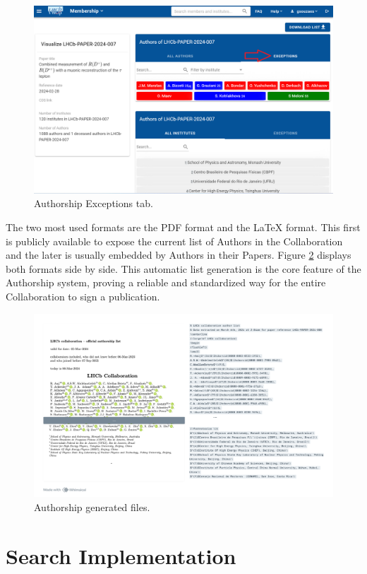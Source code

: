 \begin{figure}[H]
    \centering
    \includegraphics[width=0.8\linewidth]{figuras/authorship_exceptions_tcc.png}
    \caption{Authorship Exceptions tab.}
    \label{fig:authorship_exceptions_tcc}
\end{figure}

The two most used formats are the PDF format and the LaTeX format. This first is publicly available to expose the current list of Authors in the Collaboration and the later is usually embedded by Authors in their Papers. Figure \ref{fig:authorship_formats} displays both formats side by side. This automatic list generation is the core feature of the Authorship system, proving a reliable and standardized way for the entire Collaboration to sign a publication.

\begin{figure}[H]
    \centering
    \includegraphics[width=1\linewidth]{figuras/authorship_tcc.png}
    \caption{Authorship generated files.}
    \label{fig:authorship_formats}
\end{figure}


\section{Search Implementation}  
